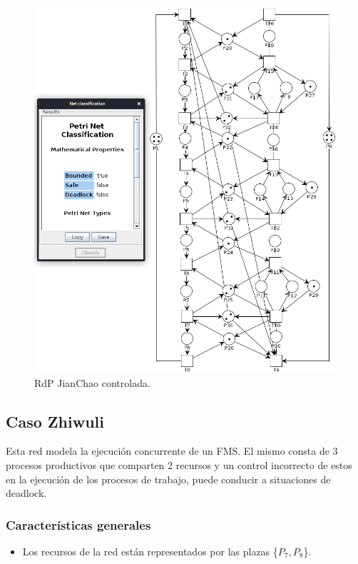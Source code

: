 \begin{figure}[H]
	\centering
	\includegraphics[width=\textwidth]{Figures/testing/jianchao_controlada.png}
	\caption[RdP JianChao controlada]{RdP JianChao controlada.}
	\label{fig:jianchaocontrolada}
 \end{figure}


\subsection{Caso Zhiwuli}
Esta red modela la ejecución concurrente de un FMS. El mismo consta de 3 procesos productivos que comparten 2 recursos y un control incorrecto de estos en la ejecución de los procesos de trabajo, puede conducir a situaciones de deadlock.

\subsubsection{Características generales}
\begin{itemize}
    \item Los recursos de la red están representados por las plazas \{$P_{7},P_{8}$\}.
\end{itemize}

